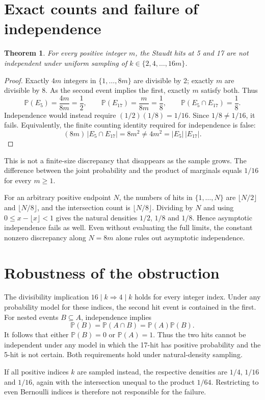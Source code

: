 \documentclass[10pt]{article}
\newtheorem{theorem}{Theorem}
\begin{document}
\section{Exact counts and failure of independence}
\begin{theorem}
For every positive integer $m$, the Staudt hits at 5 and 17 are not independent under uniform sampling of $k\in\{2,4,\ldots,16m\}$.
\end{theorem}
\begin{proof}
Exactly $4m$ integers in $\{1,\ldots,8m\}$ are divisible by 2; exactly $m$ are divisible by 8. As the second event implies the first, exactly $m$ satisfy both. Thus
\[
 \mathbb P(E_5)=\frac{4m}{8m}=\frac12,\qquad
 \mathbb P(E_{17})=\frac{m}{8m}=\frac18,\qquad
 \mathbb P(E_5\cap E_{17})=\frac18.
\]
Independence would instead require $(1/2)(1/8)=1/16$. Since $1/8\ne1/16$, it fails. Equivalently, the finite counting identity required for independence is false:
\[
 (8m)\,|E_5\cap E_{17}|=8m^2
 \ne 4m^2=|E_5|\,|E_{17}|.
\]
\end{proof}
This is not a finite-size discrepancy that disappears as the sample grows. The difference between the joint probability and the product of marginals equals $1/16$ for every $m\ge1$.

For an arbitrary positive endpoint $N$, the numbers of hits in $\{1,\ldots,N\}$ are $\lfloor N/2\rfloor$ and $\lfloor N/8\rfloor$, and the intersection count is $\lfloor N/8\rfloor$. Dividing by $N$ and using $0\le x-\lfloor x\rfloor<1$ gives the natural densities $1/2$, $1/8$ and $1/8$. Hence asymptotic independence fails as well. Even without evaluating the full limits, the constant nonzero discrepancy along $N=8m$ alone rules out asymptotic independence.
\section{Robustness of the obstruction}
The divisibility implication $16\mid k\Rightarrow4\mid k$ holds for every integer index. Under any probability model for these indices, the second hit event is contained in the first. For nested events $B\subseteq A$, independence implies
\[
 \mathbb P(B)=\mathbb P(A\cap B)=\mathbb P(A)\mathbb P(B).
\]
It follows that either $\mathbb P(B)=0$ or $\mathbb P(A)=1$. Thus the two hits cannot be independent under any model in which the 17-hit has positive probability and the 5-hit is not certain. Both requirements hold under natural-density sampling.

If all positive indices $k$ are sampled instead, the respective densities are $1/4$, $1/16$ and $1/16$, again with the intersection unequal to the product $1/64$. Restricting to even Bernoulli indices is therefore not responsible for the failure.
\end{document}

